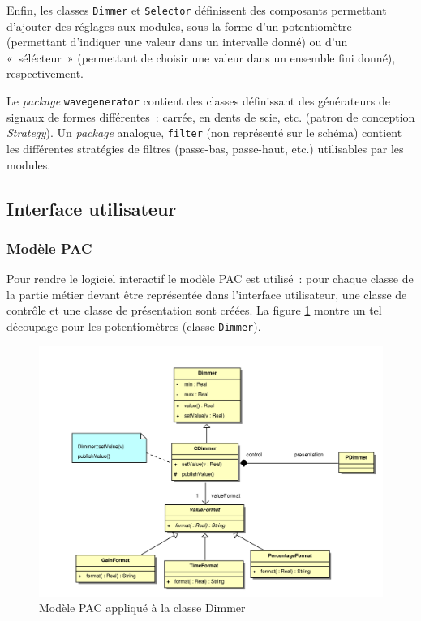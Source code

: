 Enfin, les classes \verb!Dimmer! et \verb!Selector! définissent des
composants permettant d'ajouter des réglages aux modules, sous la
forme d'un potentiomètre (permettant d'indiquer une valeur dans un
intervalle donné) ou d'un «~sélécteur~» (permettant de choisir une
valeur dans un ensemble fini donné), respectivement.

Le \emph{package} \verb!wavegenerator! contient des classes
définissant des générateurs de signaux de formes différentes~:
carrée, en dents de scie, etc. (patron de conception
\emph{Strategy}). Un \emph{package} analogue, \verb!filter! (non
représenté sur le schéma) contient les différentes stratégies de
filtres (passe-bas, passe-haut, etc.) utilisables par les modules.

\subsection{Interface utilisateur}

\subsubsection{Modèle PAC}

Pour rendre le logiciel interactif le modèle PAC est utilisé~: pour
chaque classe de la partie métier devant être représentée dans
l'interface utilisateur, une classe de contrôle et une classe de
présentation sont créées. La figure \ref{pacdimmer-pim} montre un tel découpage pour
les potentiomètres (classe \verb!Dimmer!).

\begin{figure}[htb]
\centering
\includegraphics[width=16cm]{../img/ps/pacdimmer-pim.pdf}
\caption{Modèle PAC appliqué à la classe Dimmer}
\label{pacdimmer-pim}
\end{figure}

